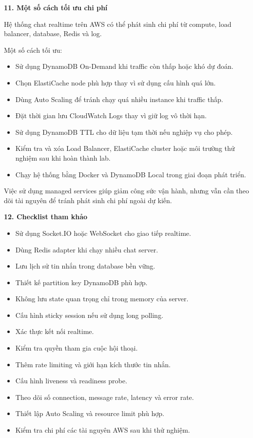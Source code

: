 \vspace{0.5em}\noindent\textbf{11. Một số cách tối ưu chi
phí}\par

Hệ thống chat realtime trên AWS có thể phát sinh chi phí từ compute,
load balancer, database, Redis và log.

Một số cách tối ưu:

\begin{itemize}
\tightlist
\item
  Sử dụng DynamoDB On-Demand khi traffic còn thấp hoặc khó dự đoán.
\item
  Chọn ElastiCache node phù hợp thay vì sử dụng cấu hình quá lớn.
\item
  Dùng Auto Scaling để tránh chạy quá nhiều instance khi traffic thấp.
\item
  Đặt thời gian lưu CloudWatch Logs thay vì giữ log vô thời hạn.
\item
  Sử dụng DynamoDB TTL cho dữ liệu tạm thời nếu nghiệp vụ cho phép.
\item
  Kiểm tra và xóa Load Balancer, ElastiCache cluster hoặc môi trường thử
  nghiệm sau khi hoàn thành lab.
\item
  Chạy hệ thống bằng Docker và DynamoDB Local trong giai đoạn phát
  triển.
\end{itemize}

Việc sử dụng managed services giúp giảm công sức vận hành, nhưng vẫn cần
theo dõi tài nguyên để tránh phát sinh chi phí ngoài dự kiến.

\vspace{0.5em}\noindent\textbf{12. Checklist tham khảo}\par

\begin{itemize}
\tightlist
\item
  Sử dụng Socket.IO hoặc WebSocket cho giao tiếp realtime.
\item
  Dùng Redis adapter khi chạy nhiều chat server.
\item
  Lưu lịch sử tin nhắn trong database bền vững.
\item
  Thiết kế partition key DynamoDB phù hợp.
\item
  Không lưu state quan trọng chỉ trong memory của server.
\item
  Cấu hình sticky session nếu sử dụng long polling.
\item
  Xác thực kết nối realtime.
\item
  Kiểm tra quyền tham gia cuộc hội thoại.
\item
  Thêm rate limiting và giới hạn kích thước tin nhắn.
\item
  Cấu hình liveness và readiness probe.
\item
  Theo dõi số connection, message rate, latency và error rate.
\item
  Thiết lập Auto Scaling và resource limit phù hợp.
\item
  Kiểm tra chi phí các tài nguyên AWS sau khi thử nghiệm.
\end{itemize}

